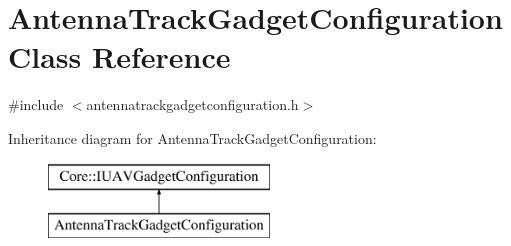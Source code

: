 \hypertarget{class_antenna_track_gadget_configuration}{\section{\-Antenna\-Track\-Gadget\-Configuration \-Class \-Reference}
\label{class_antenna_track_gadget_configuration}
}


{\ttfamily \#include $<$antennatrackgadgetconfiguration.\-h$>$}

\-Inheritance diagram for \-Antenna\-Track\-Gadget\-Configuration\-:\begin{figure}[H]
\begin{center}
\leavevmode
\includegraphics[height=2.000000cm]{class_antenna_track_gadget_configuration}
\end{center}
\end{figure}
